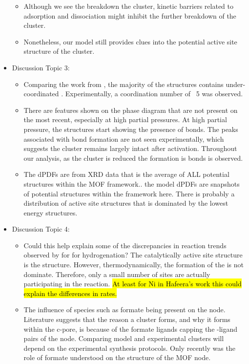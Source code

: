 \documentclass[journal=jctcce,manuscript=article]{achemso}
\begin{document}
\begin{itemize}
\begin{itemize}
        \item Although we see the breakdown the cluster, kinetic barriers related to  adsorption and dissociation might inhibit the further breakdown of the cluster.
        \item Nonetheless, our model still provides clues into the potential active site structure of the  cluster. 
    \end{itemize}
    \item Discussion Topic 3:
    \begin{itemize}
        \item  Comparing the work from \citeauthor{PlateroPrats2017}, the majority of the structures contains under-coordinated . Experimentally, a coordination number of ~5 was observed.
        \item There are features shown on the phase diagram that are not present on the most recent, especially at high  partial pressures. At high  partial pressure, the structures start showing the presence of  bonds. The peaks associated with  bond formation are not seen experimentally, which suggests the cluster remains largely intact after activation. Throughout our analysis, as the cluster is reduced the formation is  bonds is observed.     
        \item The dPDFs are from XRD data that is the average of ALL potential structures within the MOF framework.. the model dPDFs are snapshots of potential structures within the framework here. There is probably a distribution of active site structures that is dominated by the lowest energy structures. 
    \end{itemize}
    \item Discussion Topic 4:
    \begin{itemize}
        \item Could this help explain some of the discrepancies in reaction trends observed by \citeauthor{Shabbir2020} for  for  hydrogenation? The catalytically active site structure is the  structure. However, thermodynamically, the formation of the  is not dominate. Therefore, only a small number of sites are actually participating in the reaction. \hl{At least for Ni in Hafeera's work this could explain the differences in rates.}
        \item The influence of species such as formate being present on the node. Literature suggests that the reason a cluster forms, and why it forms within the c-pore, is because of the formate ligands capping the -ligand pairs of the node. Comparing model and experimental clusters will depend on the experimental synthesis protocols. Only recently was the role of formate understood on the structure of the MOF node.  
    \end{itemize}
\end{itemize}
\end{document}
